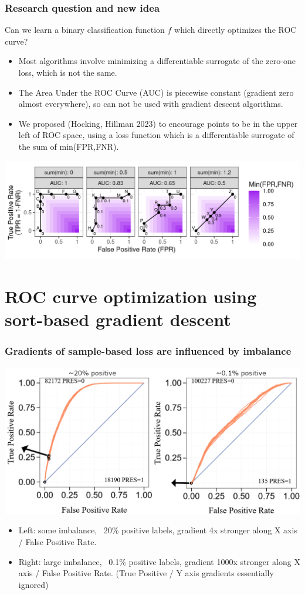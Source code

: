 \documentclass[t]{beamer}
\begin{document}
\begin{frame}
  \frametitle{Research question and new idea}
  Can we learn a binary classification function $f$ which directly
  optimizes the ROC curve?
  \begin{itemize}
  \item Most algorithms involve minimizing a differentiable surrogate
    of the zero-one loss, which is not the same.
  \item The Area Under the ROC Curve (AUC) is piecewise constant
    (gradient zero almost everywhere), so can not be used with
    gradient descent algorithms.
  \item We proposed (Hocking, Hillman 2023) to encourage points to be in the upper left of ROC
    space, using a loss function which is a differentiable surrogate
    of the sum of min(FPR,FNR).
  \end{itemize}
  \includegraphics[width=\textwidth]{figure-more-than-one-new-binary-heat}
\end{frame}
 
\section{ROC curve optimization using sort-based gradient descent}

\begin{frame}
  \frametitle{Gradients of sample-based loss are influenced by imbalance}
  \includegraphics[width=\textwidth]{roc-gradient-arrows}
  \begin{itemize}
  \item Left: some imbalance, ~20\% positive labels, gradient 4x
    stronger along X axis / False Positive Rate.
  \item Right: large imbalance, ~0.1\% positive labels, gradient 1000x
    stronger along X axis / False Positive Rate. (True Positive / Y
    axis gradients essentially ignored)
  \end{itemize}
\end{frame}
\end{document}
